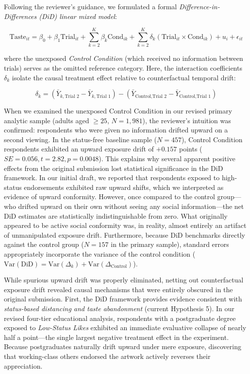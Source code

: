 \documentclass[11pt, letterpaper]{article}
\begin{document}
Following the reviewer's guidance, we formulated a formal \textit{Difference-in-Differences (DiD) linear mixed model}:

\begin{equation}
\text{Taste}_{it} = \beta_0 + \beta_1 \text{Trial}_{it} + \sum_{k=2}^{K} \beta_k \text{Cond}_{ik} + \sum_{k=2}^{K} \delta_k (\text{Trial}_{it} \times \text{Cond}_{ik}) + u_i + \epsilon_{it}
\label{eq:did_model_resp}
\end{equation}

where the unexposed \textit{Control Condition} (which received no information between trials) serves as the omitted reference category. Here, the interaction coefficients $\delta_k$ isolate the causal treatment effect relative to counterfactual temporal drift:

\begin{equation*}
\delta_k = (\bar{Y}_{k, \text{Trial 2}} - \bar{Y}_{k, \text{Trial 1}}) - (\bar{Y}_{\text{Control}, \text{Trial 2}} - \bar{Y}_{\text{Control}, \text{Trial 1}})
\end{equation*}

When we examined the unexposed Control Condition in our revised primary analytic sample (adults aged $\ge 25$, $N = 1,981$), the reviewer's intuition was confirmed: respondents who were given no information drifted upward on a second viewing. In the status-free baseline sample ($N = 457$), Control Condition respondents exhibited an upward exposure drift of $+0.157$ points ($SE = 0.056, t = 2.82, p = 0.0048$). This explains why several apparent positive effects from the original submission lost statistical significance in the DiD framework. In our initial draft, we reported that respondents exposed to high-status endorsements exhibited raw upward shifts, which we interpreted as evidence of upward conformity. However, once compared to the control group---who drifted upward on their own without seeing any social information---the net DiD estimates are statistically indistinguishable from zero. What originally appeared to be active social conformity was, in reality, almost entirely an artifact of unmanipulated exposure drift. Furthermore, because DiD benchmarks directly against the control group ($N = 157$ in the primary sample), standard errors appropriately incorporate the variance of the control condition ($\text{Var}(\text{DiD}) = \text{Var}(\Delta_k) + \text{Var}(\Delta_{\text{Control}})$).

While spurious upward drift was properly eliminated, netting out counterfactual exposure drift revealed causal mechanisms that were entirely obscured in the original submission. First, the DiD framework provides evidence consistent with \textit{status-based distancing and taste abandonment} (current Hypothesis 5). In our revised four-tier educational analysis, respondents with a postgraduate degree exposed to \textit{Low-Status Likes} exhibited an immediate evaluative collapse of nearly half a point---the single largest negative treatment effect in the experiment. Because postgraduates naturally drift upward under mere exposure, discovering that working-class others endorsed the artwork actively reverses their appreciation. 
\end{document}
